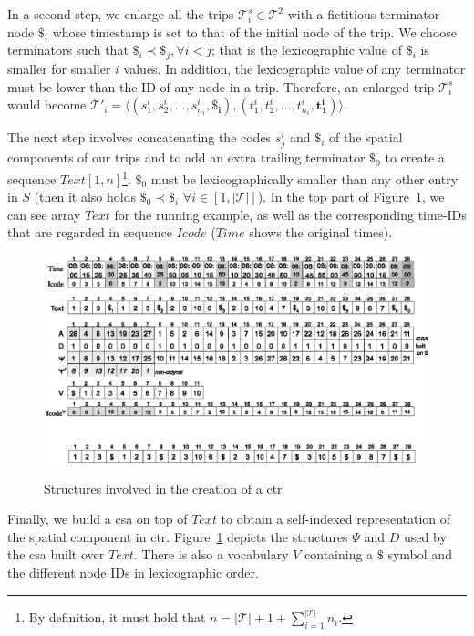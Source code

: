 	In a second step, we enlarge all the trips $\mathcal{T}^s_i \in \mathcal{T}^2$ with a fictitious terminator-node $\$_i$ whose
	timestamp is set to that of the initial node of the trip. We choose terminators such that $\$_i \prec \$_j, \forall i<j$; 
	that is the lexicographic value of $\$_i$ is smaller for smaller $i$ values. In addition, the lexicographic value
	of any terminator must be lower than the ID of any node in a trip. Therefore, an enlarged trip $\mathcal{T}^s_i$
	would become $\mathcal{T}'_i =  \langle (s^i_1, s^i_2, \dots,  s^i_{n_i}, 
	\mathbf{\$_i}),(t^i_1, t^i_2, \dots,  t^i_{n_i}, \mathbf{t^i_1}) \rangle$. 

	The next step involves concatenating the codes $s^i_j$ and $\$_i$ of the spatial components of our trips and to add an 
	extra trailing terminator $\$_0$ to create a sequence $Text[1,n]$\footnote{By definition, it must hold that $n = |\mathcal{T}| + 1 + \displaystyle\sum^{|\mathcal{T}|}_{i=1} n_i$.}. $\$_0$ must be  lexicographically 
	smaller than any other entry in $S$ (then it also holds $\$_0 \prec \$_i$ $\forall i \in [1,|\mathcal{T}|]$). In the top part of
	Figure~\ref{fig:tcsa}, we can see array $Text$ for the running example, as well as the corresponding time-IDs that
	are regarded in sequence $Icode$  ($Time$ shows the original times).
	
	\begin{figure}[ht]
	  \begin{center}
	  {\includegraphics[width=1.00\textwidth]{figures/csttr.eps}}
	  \end{center}
	  \caption{Structures involved in the creation of a \acrshort{ctr}}
	  \label{fig:tcsa}
	\end{figure}

	Finally, we build a \gls{csa} on top of $Text$ to obtain a self-indexed representation of the spatial component in \gls{ctr}.
	Figure~\ref{fig:tcsa} depicts the structures $\Psi$ and $D$ used by the \gls{csa} built over $Text$. There is also a vocabulary
	$V$ containing a $\$$ symbol and the different node IDs in lexicographic order.

